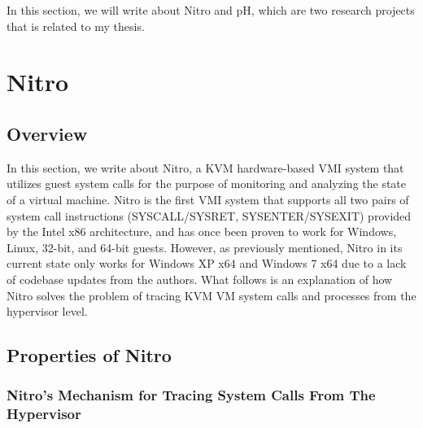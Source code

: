 \documentclass{report}
\begin{document}
\begin{spacing}{1.5}
{\large
In this section, we will write about Nitro and pH, which are two research projects that is related to my thesis. 
\newline
}

\section{Nitro}

\subsection{Overview}

{\large
In this section, we write about Nitro, a KVM hardware-based VMI system that utilizes guest system calls for the purpose of monitoring and analyzing the state of a virtual machine. Nitro is the first VMI system that supports all two pairs of system call instructions (SYSCALL/SYSRET, SYSENTER/SYSEXIT) provided by the Intel x86 architecture, and has once been proven to work for Windows, Linux, 32-bit, and 64-bit guests. However, as previously mentioned, Nitro in its current state only works for Windows XP x64 and Windows 7 x64 due to a lack of codebase updates from the authors. What follows is an explanation of how Nitro solves the problem of tracing KVM VM system calls and processes from the hypervisor level.
\newline
}



\subsection{Properties of Nitro}


\subsubsection{Nitro's Mechanism for Tracing System Calls From The Hypervisor}


\end{spacing}
\end{document}
